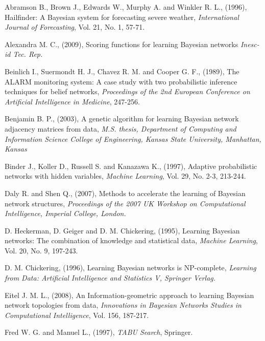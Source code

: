 \begin{bibliography}{99}
\begin{enumerate}

	
	 Abramson B., Brown J., Edwards W., Murphy A. and Winkler R. L., (1996), Hailfinder: A Bayesian system for forecasting severe weather, \emph{International Journal of Forecasting}, Vol. 21, No. 1, 57-71.
	
	 Alexandra M. C., (2009), Scoring functions for learning Bayesian networks \emph{Inesc-id Tec. Rep.}

	 Beinlich I., Suermondt H. J., Chavez R. M. and Cooper G. F., (1989), The ALARM monitoring system: A case study with two probabilistic inference techniques for belief networks, \emph{Proceedings of the 2nd European Conference on Artificial Intelligence in Medicine}, 247-256.
	
	 Benjamin B. P., (2003), A genetic algorithm for learning Bayesian network adjacency matrices from data, \emph{M.S. thesis, Department of Computing and Information Science College of Engineering, Kansas State University, Manhattan, Kansas}
	
	 Binder J., Koller D., Russell S. and Kanazawa K., (1997), Adaptive probabilistic networks with hidden variables, \emph{Machine Learning}, Vol. 29, No. 2-3, 213-244.
	
	 Daly R. and Shen Q., (2007), Methods to accelerate the learning of Bayesian network structures, \emph{Proceedings of the 2007 UK Workshop on Computational Intelligence, Imperial College, London.}
	
	 D. Heckerman, D. Geiger and D. M. Chickering, (1995), Learning Bayesian networks: The combination of knowledge and statistical data, \emph{Machine Learning}, Vol. 20, No. 9, 197-243.
	
	 D. M. Chickering, (1996), Learning Bayesian networks is NP-complete, \emph{Learning from Data: Artificial Intelligence and Statistics V, Springer Verlag.}
	
     Eitel J. M. L., (2008), An Information-geometric approach to learning Bayesian network topologies from data, \emph{Innovations in Bayesian Networks Studies in Computational Intelligence}, Vol. 156, 187-217.

	 Fred W. G. and Manuel L., (1997), \emph{TABU Search}, Springer.


\end{enumerate}
\end{bibliography}

